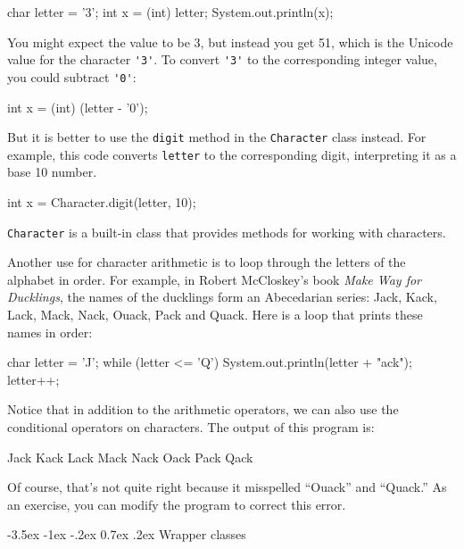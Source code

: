 \documentclass[12pt]{book}
\makeatletter
\theoremstyle{exercise}
\newcommand{\java}[1]{\verb"#1"}
\renewcommand{\section}{\@startsection{section}{1}{\z@}%
    {-3.5ex \@plus -1ex \@minus -.2ex}%
    {0.7ex \@plus.2ex}%
    {\normalfont\Large\bfseries}}
\newcommand{\java}[1]{\lstinline{#1}} %
\makeatother
\begin{document}
\begin{code}
    char letter = '3';
    int x = (int) letter;
    System.out.println(x);
\end{code}

You might expect the value to be 3, but instead you get 51, which is the Unicode value for the character \java{'3'}.
To convert \java{'3'} to the corresponding integer value, you could subtract \java{'0'}:

\begin{code}
    int x = (int) (letter - '0');
\end{code}

But it is better to use the \java{digit} method in the \java{Character} class instead.
For example, this code converts \java{letter} to the corresponding digit, interpreting it as a base 10 number.

\begin{code}
    int x = Character.digit(letter, 10);
\end{code}

\java{Character} is a built-in class that provides methods for working with characters.

Another use for character arithmetic is to loop through the letters of the alphabet in order.
For example, in Robert McCloskey's book {\em Make Way for Ducklings}, the names of the ducklings form an Abecedarian series: Jack, Kack, Lack, Mack, Nack, Ouack, Pack and Quack.
Here is a loop that prints these names in order:

\begin{code}
    char letter = 'J';
    while (letter <= 'Q') {
        System.out.println(letter + "ack");
        letter++;
    }
\end{code}

Notice that in addition to the arithmetic operators, we can also use the conditional operators on characters.
The output of this program is:

\begin{stdout}
Jack
Kack
Lack
Mack
Nack
Oack
Pack
Qack
\end{stdout}

Of course, that's not quite right because it misspelled ``Ouack'' and ``Quack.''
As an exercise, you can modify the program to correct this error.


\section{Wrapper classes}
\end{document}

